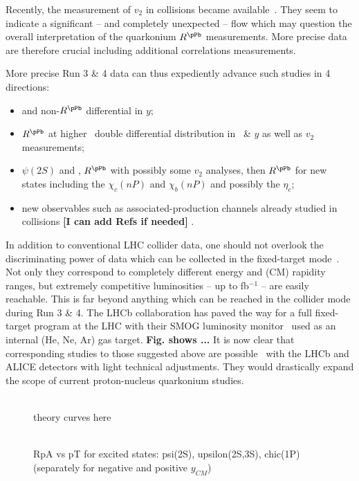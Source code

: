 \documentclass[../report.tex]{subfiles}
\begin{document}
Recently, the measurement of \PJgy $v_2$ in \pPb collisions became available~\cite{Acharya:2017tfn,CMS:2018xac}. They seem to indicate a significant -- and completely unexpected -- flow which may question the overall interpretation of the quarkonium $R^{\rm \pPb}$ measurements. More precise data are therefore crucial including additional correlations measurements. 

More precise Run 3 \& 4 data can thus expediently advance such studies in 4 directions:  
\begin{itemize}
\item  \PGU and non-\PJgy  $R^{\pPb}$ differential in $y$;
\item  \PJgy $R^{\pPb}$ at higher \pT\, double differential distribution in \pT\ \& $y$ as well as $v_2$ measurements; 
\item $\psi(2S)$ and , $R^{\rm \pPb}$ with possibly some $v_2$ analyses,
then $R^{\rm \pPb}$ for new states including  the  $\chi_c(nP)$ and $\chi_b(nP)$ and possibly the $\eta_c$;
\item new observables such as associated-production channels already studied in \pp collisions {\bf [I can add Refs if needed]}  .



\end{itemize}
In addition to conventional LHC collider data, one should not overlook the discriminating power of data which can be collected in the fixed-target mode~\cite{Brodsky:2012vg,Lansberg:2012kf}. Not only they correspond to completely different energy and (CM) rapidity ranges, but extremely competitive luminosities -- up to fb$^{-1}$ -- are easily reachable. This is far beyond anything which can be reached in the collider mode during Run 3 \& 4. The LHCb collaboration has paved the way for a full fixed-target program at the LHC with their SMOG luminosity monitor~\cite{FerroLuzzi:2005em} used as an internal (He, Ne, Ar) gas target. {\bf Fig. shows ...\cite{LHCb:2017qap}} It is now clear that corresponding studies to those suggested above are possible~\cite{Hadjidakis:2018ifr} with the LHCb and ALICE detectors with light technical adjustments. They would drastically expand the scope of current proton-nucleus quarkonium studies.


\begin{figure}[hbt!]
 \begin{center}
 ~\\
 theory curves here
\\
~\\
 \end{center}
 \caption{RpA vs pT for excited states: psi(2S), upsilon(2S,3S), chic(1P) (separately for negative and positive $y_{CM}$)}
\end{figure}
\end{document}
